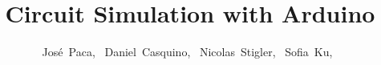 \documentclass[journal]{IEEEtran}
\begin{document}
%
\title{Circuit Simulation with Arduino}
%
%
%

\author{José~Paca,~
  Daniel~Casquino,~
  Nicolas~Stigler,~
  Sofia~Ku,~%
}

% 
%

%
% 
\end{document}
